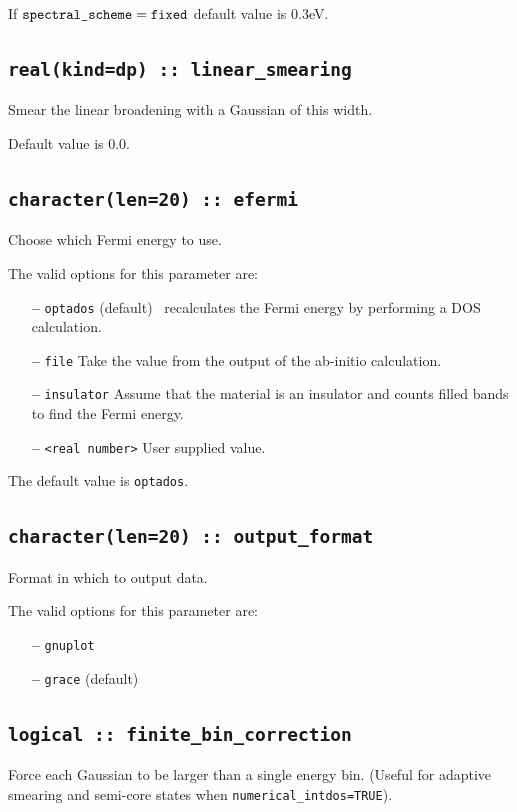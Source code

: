 \documentclass[a4paper,11pt,twoside]{book}
\begin{document}
{If $\verb#spectral_scheme# = \verb#fixed#$ default value is 0.3eV.


\subsection[adaptive\_smearing]{\tt real(kind=dp) :: linear\_smearing}
Smear the linear broadening with a Gaussian of this width. 

Default value is 0.0.

\subsection[compute\_efermi]{{\tt character(len=20) :: efermi}}
Choose which Fermi energy to use.

The valid options for this parameter are:
\begin{itemize}
\item[{\bf --}]  \verb#optados# (default) \optados\ recalculates the Fermi energy by performing a DOS calculation. 
\item[{\bf --}]  \verb#file# Take the value from the output of the ab-initio calculation.
\item[{\bf --}]  \verb#insulator# Assume that the material is an insulator and counts filled bands to find the Fermi energy.
\item[{\bf --}]  \verb#<real number># User supplied value.
\end{itemize}

The default value is {\tt optados}.


\subsection[output\_format]{\tt character(len=20) :: output\_format}
Format in which to output data.

The valid options for this parameter are:
\begin{itemize}
\item[{\bf --}]  \verb#gnuplot# 
\item[{\bf --}]  \verb#grace# (default)
\end{itemize}

\subsection[finite\_bin\_correction]{\tt logical :: finite\_bin\_correction}
Force each Gaussian to be larger than a single energy bin. (Useful for adaptive smearing and semi-core states when \verb#numerical_intdos=TRUE#). 

}
\end{document}
